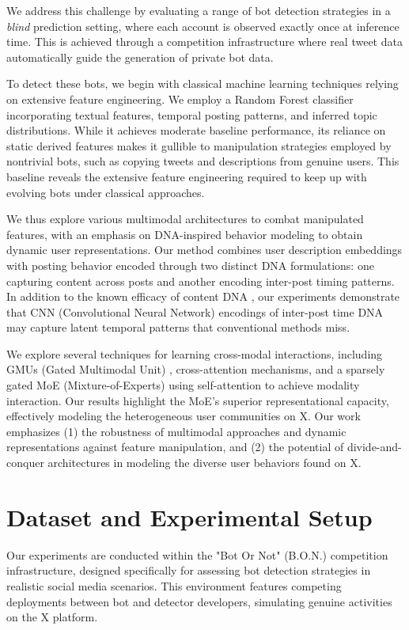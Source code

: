 \documentclass[conference]{IEEEtran}
\begin{document}
We address this challenge by evaluating 
a range of bot detection strategies in a \emph{blind} prediction setting, 
where each account is observed exactly once at inference time. 
This is achieved through
a competition infrastructure where real tweet data
automatically guide the generation of private bot data.

To detect these bots, we begin with classical machine learning 
techniques relying on extensive feature engineering.
We employ a Random Forest classifier incorporating 
textual features, temporal posting patterns, and inferred 
topic distributions. 
While it achieves moderate baseline performance,
its reliance on static derived features
makes it gullible to manipulation strategies 
employed by nontrivial bots, such as copying 
tweets and descriptions from genuine users. 
This baseline reveals the extensive feature engineering 
required to keep up with evolving bots under 
classical approaches.

We thus explore various multimodal architectures to
combat manipulated features, with an emphasis on DNA-inspired
behavior modeling to obtain dynamic user representations.
Our method combines user description embeddings with 
posting behavior encoded through two distinct DNA formulations: one 
capturing content across posts and another encoding inter-post 
timing patterns. 
In addition to the known efficacy of content DNA \citep{ilias2023multimodal}, 
our experiments demonstrate that CNN (Convolutional Neural Network) encodings of inter-post time DNA may capture latent temporal
patterns that conventional methods miss.

We explore several techniques for learning cross-modal interactions, 
including GMUs (Gated Multimodal Unit) \citep{arevalo2017gated}, cross-attention mechanisms, 
and a sparsely gated MoE (Mixture-of-Experts) \citep{shazeer2017outrageously} 
using self-attention to achieve modality interaction. 
Our results highlight the MoE's superior representational capacity,
effectively modeling the heterogeneous user communities on X.
Our work emphasizes (1) the robustness of multimodal approaches and
dynamic representations against 
feature manipulation, and (2) 
the potential of divide-and-conquer architectures
in modeling the diverse user behaviors found on X.


\section{Dataset and Experimental Setup}
Our experiments are conducted within the "Bot Or Not" (B.O.N.) 
competition infrastructure, designed specifically for assessing 
bot detection strategies in realistic social media scenarios. 
This environment features competing deployments between bot and detector 
developers, simulating genuine activities on the X platform. 
\end{document}

